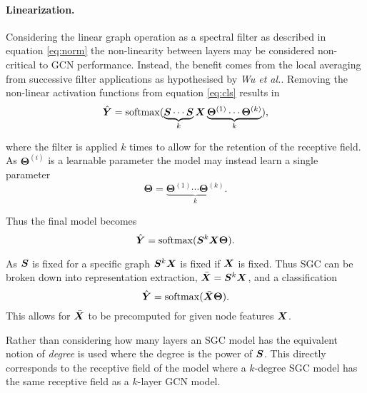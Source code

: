 \paragraph{Linearization.}
Considering the linear graph operation as a spectral filter as described in equation \ref{eq:norm} the non-linearity between layers may be considered non-critical to GCN performance.
Instead, the benefit comes from the local averaging from successive filter applications as hypothesised by \textit{Wu et al.}.
Removing the non-linear activation functions from equation \ref{eq:cls} results in
\begin{equation}
    \hat{{\bm{Y}}} = \operatorname{softmax}(\underbrace{{\bm{S}}\cdots{\bm{S}}}_k{\bm{X}}\underbrace{\bm{\Theta}^{(1)}\cdots\bm{\Theta}^{(k)}}_k),
\end{equation}

where the filter is applied $k$ times to allow for the retention of the receptive field.
As $\bm{\Theta}^{(i)}$ is a learnable parameter the model may instead learn a single parameter
\begin{equation}
    \label{eq:theta}
    \bm{\Theta} = \underbrace{\bm{\Theta}^{(1)}\cdots\bm{\Theta}^{(k)}}_k.
\end{equation}

Thus the final model becomes
\begin{equation}
    \hat{{\bm{Y}}} = \operatorname{softmax}({\bm{S}}^{k}{\bm{X}}\bm{\Theta}).
\end{equation}

As ${\bm{S}}$ is fixed for a specific graph ${\bm{S}}^k{\bm{X}}$ is fixed if ${\bm{X}}$ is fixed.
Thus SGC can be broken down into representation extraction, $\bar{{\bm{X}}} = {\bm{S}}^k{\bm{X}}$, and a classification
\begin{equation}
    \label{eq:SGC}
    \hat{{\bm{Y}}} = \operatorname{softmax}(\bar{{\bm{X}}}\bm{\Theta}).
\end{equation}
This allows for $\bar{{\bm{X}}}$ to be precomputed for given node features ${\bm{X}}$.

Rather than considering how many layers an SGC model has the equivalent notion of \emph{degree} is used where the degree is the power of ${\bm{S}}$.
This directly corresponds to the receptive field of the model where a $k$-degree SGC model has the same receptive field as a $k$-layer GCN model.

